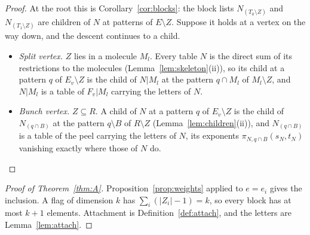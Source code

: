 \documentclass[11pt]{article}
\theoremstyle{plain}
\theoremstyle{definition}
\theoremstyle{remark}
\begin{document}
\begin{proof}
At the root this is Corollary~\ref{cor:blocks}: the block lists $N_{(T_0\setminus Z)}$ and $N_{(T_1\setminus Z)}$ are children of $N$ at patterns of $E\setminus Z$. Suppose it holds at a vertex on the way down, and the descent continues to a child.
\begin{itemize}
\item \emph{Split vertex.} $Z$ lies in a molecule $M_l$. Every table $N$ is the direct sum of its restrictions to the molecules (Lemma~\ref{lem:skeleton}(ii)), so its child at a pattern $q$ of $E_v\setminus Z$ is the child of $N|M_l$ at the pattern $q\cap M_l$ of $M_l\setminus Z$, and $N|M_l$ is a table of $F_v|M_l$ carrying the letters of $N$.
\item \emph{Bunch vertex.} $Z\subseteq R$. A child of $N$ at a pattern $q$ of $E_v\setminus Z$ is the child of $N_{(q\cap B)}$ at the pattern $q\setminus B$ of $R\setminus Z$ (Lemma~\ref{lem:children}(ii)), and $N_{(q\cap B)}$ is a table of the peel carrying the letters of $N$, its exponents $\pi_{N,q\cap B}(s_N,t_N)$ vanishing exactly where those of $N$ do. \qedhere
\end{itemize}
\end{proof}

\begin{proof}[Proof of Theorem~\ref{thm:A}]
Proposition~\ref{prop:weights} applied to $e=e_i$ gives the inclusion. A flag of dimension $k$ has $\sum_i(|Z_i|-1)=k$, so every block has at most $k+1$ elements. Attachment is Definition~\ref{def:attach}, and the letters are Lemma~\ref{lem:attach}.
\end{proof}
\end{document}
